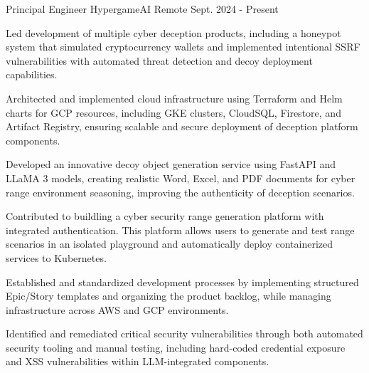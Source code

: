 
\begin{cventries}
\vspace{-3mm}
  \cventry
    {Principal Engineer} %
    {HypergameAI} %
    {Remote} %
    {Sept. 2024 - Present} %
    {
      \begin{cvitems}
        \item {
          Led development of multiple cyber deception products, including a honeypot system that simulated cryptocurrency wallets and implemented intentional SSRF vulnerabilities with automated threat detection and decoy deployment capabilities.
        }
        \item {
          Architected and implemented cloud infrastructure using Terraform and Helm charts for GCP resources, including GKE clusters, CloudSQL, Firestore, and Artifact Registry, ensuring scalable and secure deployment of deception platform components.
        }
        \item {
          Developed an innovative decoy object generation service using FastAPI and LLaMA 3 models, creating realistic Word, Excel, and PDF documents for cyber range environment seasoning, improving the authenticity of deception scenarios.
        }
        \item {
          Contributed to buildling a cyber security range generation platform with integrated authentication. This platform allows users to generate and test range scenarios in an isolated playground and automatically deploy containerized services to Kubernetes.
        }
        \item {
          Established and standardized development processes by implementing structured Epic/Story templates and organizing the product backlog, while managing infrastructure across AWS and GCP environments.
        }
        \item {
          Identified and remediated critical security vulnerabilities through both automated security tooling and manual testing, including hard-coded credential exposure and XSS vulnerabilities within LLM-integrated components.
        }
      \end{cvitems}
    }


\end{cventries}
